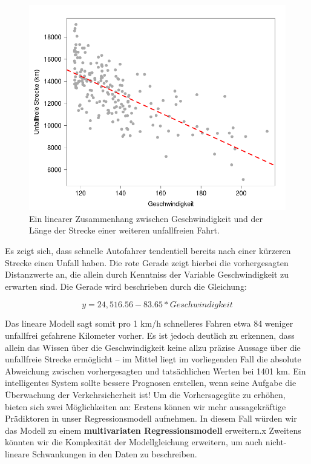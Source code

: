 \begin{figure}[!ht]
  \caption{Ein linearer Zusammenhang zwischen Geschwindigkeit und der Länge der
    Strecke einer weiteren unfallfreien Fahrt.}  \centering
  \includegraphics[width=1\textwidth]{chapters/svm/plot_lds.png}
\end{figure}

Es zeigt sich, dass schnelle Autofahrer tendentiell bereits nach einer kürzeren
Strecke einen Unfall haben. Die rote Gerade zeigt hierbei die vorhergesagten
Distanzwerte an, die allein durch Kenntniss der Variable Geschwindigkeit zu erwarten
sind. Die Gerade wird beschrieben durch die Gleichung:

\begin{equation*}
y = 24,516.56 - 83.65 * Geschwindigkeit
\end{equation*}

Das lineare Modell sagt somit pro 1 km/h schnelleres Fahren etwa 84 weniger
unfallfrei gefahrene Kilometer vorher. Es ist jedoch deutlich zu erkennen, dass
allein das Wissen über die Geschwindigkeit keine allzu präzise Aussage über die
unfallfreie Strecke ermöglicht -- im Mittel liegt im vorliegenden Fall die absolute
Abweichung zwischen vorhergesagten und tatsächlichen Werten bei 1401 km. Ein
intelligentes System sollte bessere Prognosen erstellen, wenn seine Aufgabe die
Überwachung der Verkehrsicherheit ist! Um die Vorhersagegüte zu erhöhen, bieten sich
zwei Möglichkeiten an: Erstens können wir mehr aussagekräftige Prädiktoren in unser
Regressionsmodell aufnehmen. In diesem Fall würden wir das Modell zu einem
\textbf{multivariaten Regressionsmodell} erweitern.x Zweitens könnten wir die
Komplexität der Modellgleichung erweitern, um auch nicht-lineare Schwankungen in den
Daten zu beschreiben.

